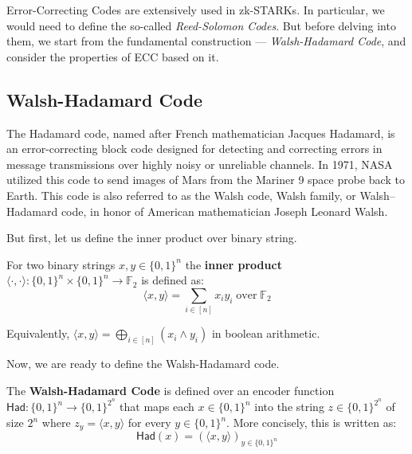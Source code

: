 \documentclass[../lecture-notes-148x210.tex]{subfiles}
\begin{document}
Error-Correcting Codes are extensively used in zk-STARKs. In particular, 
we would need to define the so-called \textit{Reed-Solomon Codes}. But 
before delving into them, we start from the fundamental construction ---
\textit{Walsh-Hadamard Code}, and consider the properties of ECC based 
on it.

\subsection{Walsh-Hadamard Code}
The Hadamard code, named after French mathematician Jacques Hadamard, is an
error-correcting block code designed for detecting and correcting errors in
message transmissions over highly noisy or unreliable channels. In 1971, NASA
utilized this code to send images of Mars from the Mariner 9 space probe back to
Earth. This code is also referred to as the Walsh code, Walsh family, or
Walsh–Hadamard code, in honor of American mathematician Joseph Leonard Walsh.

But first, let us define the inner product over binary string.

\begin{definition}
For two binary strings $x, y \in \{0, 1\}^n$ the \textbf{inner product} $\langle
\cdot, \cdot \rangle: \{0,1\}^n \times \{0,1\}^n \to \mathbb{F}_2$ is defined
as:
\begin{equation*}
    \langle x, y \rangle = \sum_{i \in [n]} x_iy_i \; \text{over} \; \mathbb{F}_2 
\end{equation*}

Equivalently, $\langle x, y \rangle = \bigoplus_{i \in [n]}(x_i \wedge y_i)$ in boolean arithmetic.

\end{definition}

Now, we are ready to define the Walsh-Hadamard code.

\begin{definition}
The \textbf{Walsh-Hadamard Code} is defined over an encoder function
$\mathsf{Had}: \{0, 1\}^n \rightarrow \{0, 1\}^{2^n}$ that maps each $x \in
\{0,1\}^n$ into the string $z \in \{0, 1\}^{2^n}$ of size $2^n$ where $z_y =
\langle x, y\rangle$ for every $y \in \{0, 1\}^n$. More concisely, this is
written as:
\begin{equation*}
    \mathsf{Had}(x) = \left(\langle x, y \rangle\right)_{y \in \{0, 1\}^n}
\end{equation*}
\end{definition}
\end{document}
